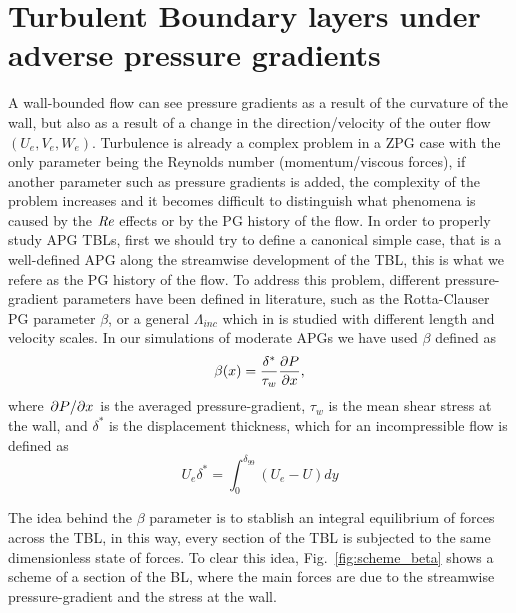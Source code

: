
\section{Turbulent Boundary layers under adverse pressure gradients}

A wall-bounded flow can see pressure gradients as a result of the curvature of the wall, but also as a result of a change in the direction/velocity of the outer flow $(U_{e}, V_{e}, W_{e})$. Turbulence is already a complex problem in a ZPG case with the only parameter being the Reynolds number (momentum/viscous forces), if another parameter such as pressure gradients is added, the complexity of the problem increases and it becomes difficult to distinguish what phenomena is caused by the $\mbox{\textit{Re}}$ effects or by the PG history of the flow.
In order to properly study APG TBLs, first we should try to define a canonical simple case, that is a well-defined APG along the streamwise development of the TBL, this is what we refere as the PG history of the flow.
To address this problem, different pressure-gradient parameters have been defined in literature, such as the Rotta-Clauser PG parameter $\beta$, or a general $\Lambda_{inc}$ which in \cite{Gibis2019} is studied with different length and velocity scales.
In our simulations of moderate APGs we have used $\beta$ defined as
\begin{equation}
    \beta(x) = \frac{\delta^*}{\tau_w} \pdv{P}{x},
\end{equation}
where $\pdv{P}/{x}$ is the averaged pressure-gradient, $\tau_w$ is the mean shear stress at the wall, and $\delta^*$ is the displacement thickness, which for an incompressible flow is defined as
\begin{equation}
    U_e \delta^* = \int_{0}^{\delta_{99}} (U_e - U) dy
\end{equation}

The idea behind the $\beta$ parameter is to stablish an integral equilibrium of forces across the TBL, in this way, every section of the TBL is subjected to the same dimensionless state of forces.
To clear this idea, Fig.~\ref{fig:scheme_beta} shows a scheme of a section of the BL, where the main forces are due to the streamwise pressure-gradient and the stress at the wall.

